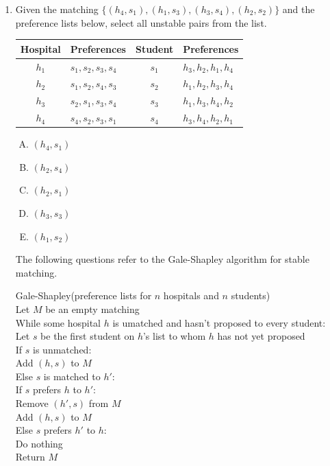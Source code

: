 \documentclass[11pt]{article}
\begin{document}
\begin{enumerate}
Select A for yes and B for no.

\item Given the matching
$\{(h_4, s_1), (h_1, s_3), (h_3, s_4), (h_2, s_2)\}$ and the
preference lists below,
select all unstable pairs from the list.

\begin{table}[h]
\centering
\begin{tabular}{c | l || c | l}
\textbf{Hospital} & \textbf{Preferences} & \textbf{Student} & \textbf{Preferences} \\
\hline
$h_1$ & $s_1 , s_2 , s_3 , s_4$ & $s_1$ & $h_3 , h_2 , h_1 , h_4$ \\
$h_2$ & $s_1 , s_2 , s_4 , s_3$ & $s_2$ & $h_1 , h_2 , h_3 , h_4$ \\
$h_3$ & $s_2 , s_1 , s_3 , s_4$ & $s_3$ & $h_1 , h_3 , h_4 , h_2$ \\
$h_4$ & $s_4 , s_2 , s_3 , s_1$ & $s_4$ & $h_3 , h_4 , h_2 , h_1$ \\
\end{tabular}
\end{table}

\begin{enumerate}[A.]
    \item $(h_4, s_1)$
    \item $(h_2, s_4)$
    \item $(h_2, s_1)$
    \item $(h_3, s_3)$
    \item $(h_1, s_2)$
\end{enumerate}


The following questions refer to the Gale-Shapley algorithm for
stable matching.

    \begin{algo}
    Gale-Shapley(preference lists for $n$ hospitals and $n$ students)\+\\
    Let $M$ be an empty matching\\
    While some hospital $h$ is umatched and hasn't proposed to every student:\+ \\
        Let $s$ be the first student on $h$'s list to whom $h$ has not yet proposed\\
        If $s$ is unmatched:\+\\
            Add $(h,s)$ to $M$\-\\
        Else $s$ is matched to $h'$:\+\\
            If $s$ prefers $h$ to $h'$:\+\\
                Remove $(h',s)$ from $M$\\
                Add $(h,s)$ to $M$\-\\
            Else $s$ prefers $h'$ to $h$:\+\\
                Do nothing\-\-\-\\
    Return $M$\\
    \end{algo}


\end{enumerate}
\end{document}

